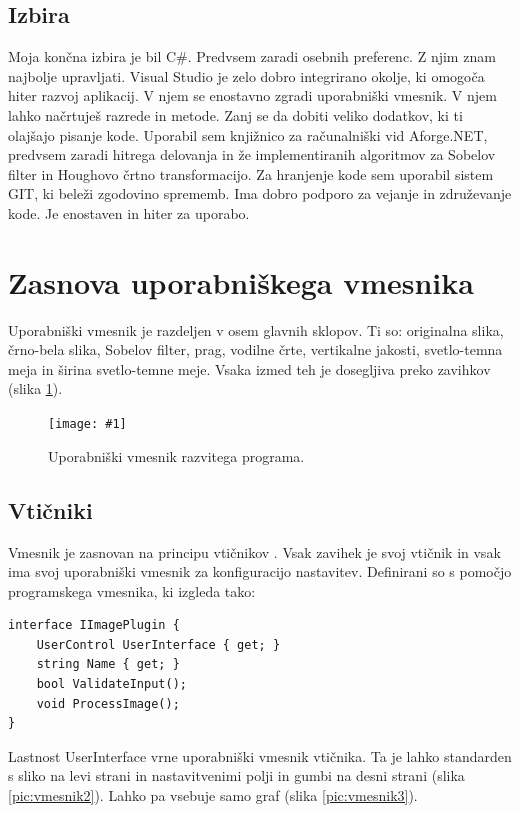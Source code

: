 \documentclass[oneside, a4paper, 12pt]{book}
\newcommand{\slika}[3]{
	\begin{figure}
	\begin{center}
	\texttt{[image: \#1]}
	\end{center}
	\vspace{-20pt}
	\caption{#2}
	\label{#3}
	\end{figure}
}
\begin{document}
\subsection{Izbira}
Moja končna izbira je bil C\#. Predvsem zaradi osebnih preferenc. Z 
njim znam najbolje upravljati. Visual Studio je zelo dobro integrirano 
okolje, ki omogoča hiter razvoj aplikacij. V njem se enostavno zgradi 
uporabniški vmesnik. V njem lahko načrtuješ razrede in metode. Zanj se 
da dobiti veliko dodatkov, ki ti olajšajo pisanje kode. Uporabil sem 
knjižnico za računalniški vid Aforge.NET, predvsem zaradi hitrega 
delovanja in že implementiranih algoritmov za Sobelov filter in Houghovo
črtno transformacijo. Za hranjenje kode sem uporabil sistem GIT, ki 
beleži zgodovino sprememb. Ima dobro podporo za vejanje in združevanje 
kode. Je enostaven in hiter za uporabo.

\section{Zasnova uporabniškega vmesnika}
Uporabniški vmesnik je razdeljen v osem glavnih sklopov. Ti so: originalna 
slika, črno-bela slika, Sobelov filter, prag, vodilne črte, vertikalne 
jakosti, svetlo-temna meja in širina svetlo-temne meje. Vsaka izmed teh 
je dosegljiva preko zavihkov (slika \ref{pic:vmesnik1}).

\slika{slike/vmesnik-glavni.jpg}{Uporabniški vmesnik razvitega programa.}
{pic:vmesnik1}

\subsection{Vtičniki}
Vmesnik je zasnovan na principu vtičnikov \cite{oreilly-dp, oreilly-cs}. 
Vsak zavihek je svoj vtičnik in vsak ima svoj uporabniški vmesnik za 
konfiguracijo nastavitev. Definirani so s pomočjo programskega vmesnika, 
ki izgleda tako:
\begin{samepage}
\begin{verbatim}
interface IImagePlugin {
    UserControl UserInterface { get; }
    string Name { get; }
    bool ValidateInput();
    void ProcessImage();
}
\end{verbatim}
\end{samepage}
Lastnost UserInterface vrne uporabniški vmesnik vtičnika. Ta je lahko 
standarden s sliko na levi strani in nastavitvenimi polji in gumbi na 
desni strani (slika \ref{pic:vmesnik2}). Lahko pa vsebuje samo graf 
(slika \ref{pic:vmesnik3}).
\end{document}
